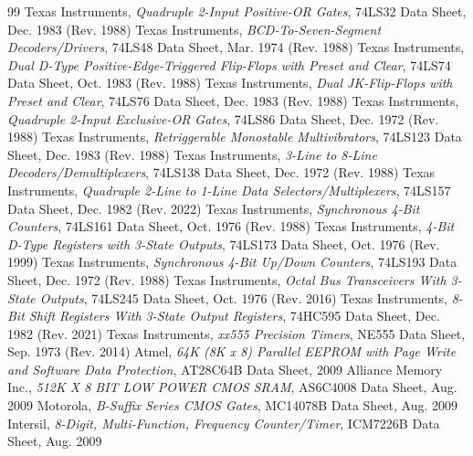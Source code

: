 \begin{thebibliography}{99}
 Texas Instruments, \emph{Quadruple 2-Input Positive-OR Gates}, 74LS32 Data Sheet, Dec. 1983 (Rev. 1988)
 Texas Instruments, \emph{BCD-To-Seven-Segment Decoders/Drivers}, 74LS48 Data Sheet, Mar. 1974 (Rev. 1988)
 Texas Instruments, \emph{Dual D-Type Positive-Edge-Triggered Flip-Flops with Preset and Clear}, 74LS74 Data Sheet, Oct. 1983 (Rev. 1988)
 Texas Instruments, \emph{Dual JK-Flip-Flops with Preset and Clear}, 74LS76 Data Sheet, Dec. 1983 (Rev. 1988)
 Texas Instruments, \emph{Quadruple 2-Input Exclusive-OR Gates}, 74LS86 Data Sheet, Dec. 1972 (Rev. 1988)
 Texas Instruments, \emph{Retriggerable Monostable Multivibrators}, 74LS123 Data Sheet, Dec. 1983 (Rev. 1988)
 Texas Instruments, \emph{3-Line to 8-Line Decoders/Demultiplexers}, 74LS138 Data Sheet, Dec. 1972 (Rev. 1988)
 Texas Instruments, \emph{Quadruple 2-Line to 1-Line Data Selectors/Multiplexers}, 74LS157 Data Sheet, Dec. 1982 (Rev. 2022)
 Texas Instruments, \emph{Synchronous 4-Bit Counters}, 74LS161 Data Sheet, Oct. 1976 (Rev. 1988)
 Texas Instruments, \emph{4-Bit D-Type Registers with 3-State Outputs}, 74LS173 Data Sheet, Oct. 1976 (Rev. 1999)
 Texas Instruments, \emph{Synchronous 4-Bit Up/Down Counters}, 74LS193 Data Sheet, Dec. 1972 (Rev. 1988)
 Texas Instruments, \emph{Octal Bus Transceivers With 3-State Outputs}, 74LS245 Data Sheet, Oct. 1976 (Rev. 2016)
 Texas Instruments, \emph{8-Bit Shift Registers With 3-State Output Registers}, 74HC595 Data Sheet, Dec. 1982 (Rev. 2021)
 Texas Instruments, \emph{xx555 Precision Timers}, NE555 Data Sheet, Sep. 1973 (Rev. 2014)
 Atmel, \emph{64K (8K x 8) Parallel EEPROM with Page Write and Software Data Protection}, AT28C64B Data Sheet, 2009
 Alliance Memory Inc., \emph{512K X 8 BIT LOW POWER CMOS SRAM}, AS6C4008 Data Sheet, Aug. 2009
 Motorola, \emph{B-Suffix Series CMOS Gates}, MC14078B Data Sheet, Aug. 2009
 Intersil, \emph{8-Digit, Multi-Function, Frequency Counter/Timer}, ICM7226B Data Sheet, Aug. 2009
\end{thebibliography}
